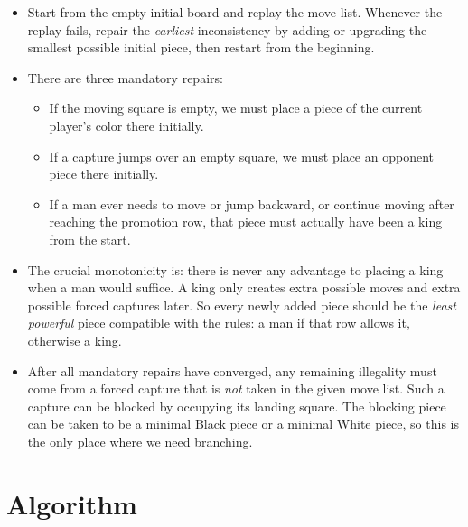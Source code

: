 \documentclass[11pt]{article}
\begin{document}
\begin{itemize}[leftmargin=*]
    \item Start from the empty initial board and replay the move list. Whenever the replay fails, repair the \emph{earliest} inconsistency by adding or upgrading the smallest possible initial piece, then restart from the beginning.
    \item There are three mandatory repairs:
    \begin{itemize}[leftmargin=*]
        \item If the moving square is empty, we must place a piece of the current player's color there initially.
        \item If a capture jumps over an empty square, we must place an opponent piece there initially.
        \item If a man ever needs to move or jump backward, or continue moving after reaching the promotion row, that piece must actually have been a king from the start.
    \end{itemize}
    \item The crucial monotonicity is: there is never any advantage to placing a king when a man would suffice. A king only creates extra possible moves and extra possible forced captures later. So every newly added piece should be the \emph{least powerful} piece compatible with the rules: a man if that row allows it, otherwise a king.
    \item After all mandatory repairs have converged, any remaining illegality must come from a forced capture that is \emph{not} taken in the given move list. Such a capture can be blocked by occupying its landing square. The blocking piece can be taken to be a minimal Black piece or a minimal White piece, so this is the only place where we need branching.
\end{itemize}

\section*{Algorithm}
\end{document}
